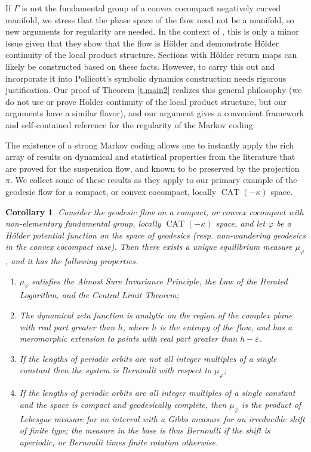 \documentclass[10pt]{amsart}
\let\epsilon\varepsilon
\newtheorem{corx}[thmx]{Corollary}
\theoremstyle{definition}
\numberwithin{equation}{section}
\DeclareMathOperator{\CAT}{CAT}
\begin{document}
If $\Gamma$ is not the fundamental group of a convex cocompact negatively curved manifold, we stress that the phase space of the flow need not be a manifold, so new arguments for regularity are needed. In the context of \cite{bcls}, this is only a minor issue given that they show that the flow is Hölder and demonstrate Hölder continuity of the local product structure. Sections with Hölder return maps can likely be constructed based on these facts. However, to carry this out and incorporate it into Pollicott's symbolic dynamics construction needs rigorous justification. Our proof of Theorem \ref{t.main2} realizes this general philosophy (we do not use or prove Hölder continuity of the local product structure, but our arguments have a similar flavor), and our argument gives a convenient framework and self-contained reference for the regularity of the Markov coding.

The existence of a strong Markov coding allows one to instantly apply the rich array of results on dynamical and statistical properties from the literature that are proved for the suspension flow, and known to be preserved by the projection $\pi$. We collect some of these results as they apply to our primary example of the geodesic flow for a compact, or convex cocompact, locally $\CAT(-\kappa)$ space.

\begin{corx}\label{t.applications}
Consider the geodesic flow on a compact, or convex cocompact with non-elementary fundamental group, locally $\CAT(-\kappa)$ space, and let $\varphi$ be a Hölder potential function on the space of geodesics (resp. non-wandering geodesics in the convex cocompact case). Then there exists a unique equilibrium measure $\mu_\varphi$, and it has the following properties.
\begin{enumerate}
\item\label{t.applications1} $\mu_\varphi$ satisfies the Almost Sure Invariance Principle, the Law of the Iterated Logarithm, and the Central Limit Theorem;
\item\label{t.applications2} The dynamical zeta function is analytic on the region of the complex plane with real part greater than $h$, where $h$ is the entropy of the flow, and has a meromorphic extension to points with real part greater than $h- \epsilon$.
\item\label{t.applications3} If the lengths of periodic orbits are not all integer multiples of a single constant then the system is Bernoulli with respect to $\mu_\varphi$;
\item\label{t.applications4} If the lengths of periodic orbits are all integer multiples of a single constant and the space is compact and geodesically complete, then $\mu_\varphi$ is the product of Lebesgue measure for an interval with a Gibbs measure for an irreducible shift of finite type; the measure in the base is thus Bernoulli if the shift is aperiodic, or Bernoulli times finite rotation otherwise.
\end{enumerate}
\end{corx}
\end{document}
